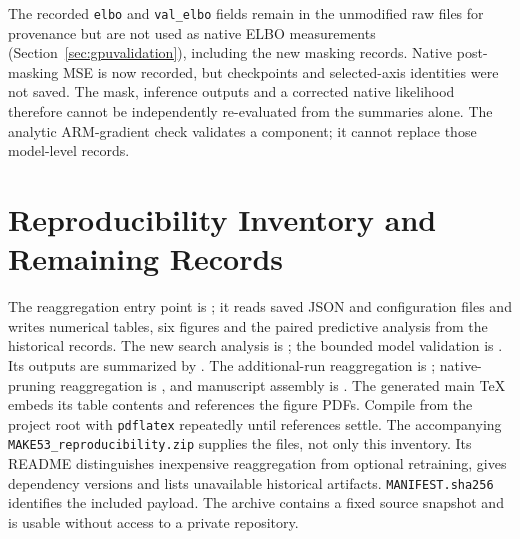 \documentclass[make,article,submit,pdftex,moreauthors]{Definitions/mdpi}
\begin{document}
The recorded \texttt{elbo} and \texttt{val\_elbo} fields remain in the
unmodified raw files for provenance but are not used as native ELBO
measurements (Section~\ref{sec:gpuvalidation}), including the new masking
records. Native post-masking MSE is now recorded, but checkpoints and
selected-axis identities were not saved. The mask, inference outputs
and a corrected native likelihood therefore cannot be independently
re-evaluated from the summaries alone. The analytic ARM-gradient check
validates a component; it cannot replace those model-level records.


\section{Reproducibility Inventory and Remaining Records}\label{app:inventory}
The reaggregation entry point is
; it reads saved JSON and configuration
files and writes numerical tables, six figures and the paired predictive
analysis from the historical records. The new search analysis is
; the bounded model validation is
. Its outputs are summarized by
. The additional-run reaggregation is
; native-pruning reaggregation is
, and manuscript assembly is
. The generated main TeX embeds its
table contents and references the figure PDFs. Compile from the project
root with \texttt{pdflatex} repeatedly until references settle.
The accompanying \texttt{MAKE53\_reproducibility.zip} supplies the files,
not only this inventory. Its README distinguishes inexpensive
reaggregation from optional retraining, gives dependency versions and
lists unavailable historical artifacts. \texttt{MANIFEST.sha256}
identifies the included payload. The archive contains a fixed source
snapshot and is usable without access to a private repository.
\end{document}

